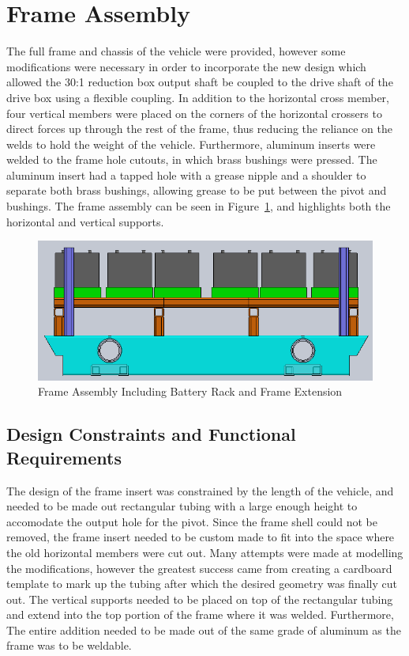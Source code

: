 \section{Frame Assembly}
The full frame and chassis of the vehicle were provided, however some modifications were necessary in order to incorporate the new design which allowed the 30:1 reduction box output shaft be coupled to the drive shaft of the drive box using a flexible coupling. In addition to the horizontal cross member, four vertical members were placed on the corners of the horizontal crossers to direct forces up through the rest of the frame, thus reducing the reliance on the welds to hold the weight of the vehicle. Furthermore, aluminum inserts were welded to the frame hole cutouts, in which brass bushings were pressed. The aluminum insert had a tapped hole with a grease nipple and a shoulder to separate both brass bushings, allowing grease to be put between the pivot and bushings. The frame assembly can be seen in Figure~\ref{fig:battery_rack_and_frame_mount_drw}, and highlights both the horizontal and vertical supports.   
\begin{figure}[h]
\centering
\includegraphics[width=0.8\linewidth]{./images/battery_rack_and_frame_mount_drw}
\caption{Frame Assembly Including Battery Rack and Frame Extension}
\label{fig:battery_rack_and_frame_mount_drw}
\end{figure}
\subsection{Design Constraints and Functional Requirements}
The design of the frame insert was constrained by the length of the vehicle, and needed to be made out rectangular tubing with a large enough height to accomodate the output hole for the pivot. Since the frame shell could not be removed, the frame insert needed to be custom made to fit into the space where the old horizontal members were cut out. Many attempts were made at modelling the modifications, however the greatest success came from creating a cardboard template to mark up the tubing after which the desired geometry was finally cut out. The vertical supports needed to be placed on top of the rectangular tubing and extend into the top portion of the frame where it was welded. Furthermore, The entire addition needed to be made out of the same grade of aluminum as the frame was to be weldable.  

